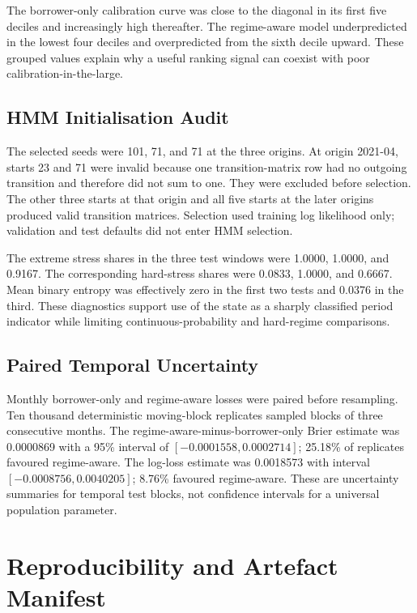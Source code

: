 The borrower-only calibration curve was close to the diagonal in its first five deciles and increasingly high thereafter. The regime-aware model underpredicted in the lowest four deciles and overpredicted from the sixth decile upward. These grouped values explain why a useful ranking signal can coexist with poor calibration-in-the-large.

\section{HMM Initialisation Audit}

The selected seeds were 101, 71, and 71 at the three origins. At origin 2021-04, starts 23 and 71 were invalid because one transition-matrix row had no outgoing transition and therefore did not sum to one. They were excluded before selection. The other three starts at that origin and all five starts at the later origins produced valid transition matrices. Selection used training log likelihood only; validation and test defaults did not enter HMM selection.

The extreme stress shares in the three test windows were 1.0000, 1.0000, and 0.9167. The corresponding hard-stress shares were 0.0833, 1.0000, and 0.6667. Mean binary entropy was effectively zero in the first two tests and 0.0376 in the third. These diagnostics support use of the state as a sharply classified period indicator while limiting continuous-probability and hard-regime comparisons.

\section{Paired Temporal Uncertainty}

Monthly borrower-only and regime-aware losses were paired before resampling. Ten thousand deterministic moving-block replicates sampled blocks of three consecutive months. The regime-aware-minus-borrower-only Brier estimate was 0.0000869 with a 95\% interval of $[-0.0001558,0.0002714]$; 25.18\% of replicates favoured regime-aware. The log-loss estimate was 0.0018573 with interval $[-0.0008756,0.0040205]$; 8.76\% favoured regime-aware. These are uncertainty summaries for temporal test blocks, not confidence intervals for a universal population parameter.

\chapter{Reproducibility and Artefact Manifest}
\label{app:reproducibility}

